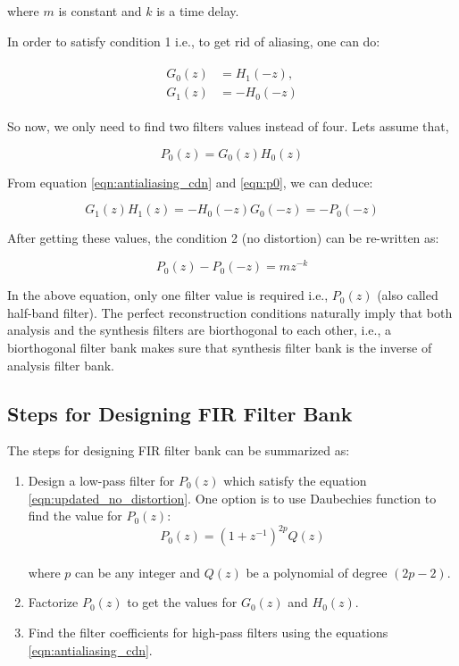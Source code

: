 where $m$ is constant and $k$ is a time delay.

In order to satisfy condition 1 i.e., to get rid of aliasing, one can do:

\begin{align}
	\label{eqn:antialiasing_cdn}
	\begin{split}
		G_0(z) &=  H_1(-z), \\ 
		G_1(z) &=  -H_0(-z)
	\end{split}
\end{align}


So now, we only need to find two filters values instead of four. Lets assume that,

\begin{equation}\label{eqn:p0} 
{P_0(z)=G_{0}(z)H_{0}(z)}
\end{equation}

From equation \ref{eqn:antialiasing_cdn} and \ref{eqn:p0}, we can deduce:

\begin{equation} 
{G_{1}(z)H_{1}(z) = -H_{0}(-z)G_{0}(-z) = -P_0(-z)}
\end{equation}

After getting these values, the condition 2 (no distortion) can be re-written as:

\begin{equation}\label{eqn:updated_no_distortion} 
{P_0(z) - P_0(-z) =  mz^{-k}}
\end{equation}

In the above equation, only one filter value is required i.e., $P_0(z)$ (also called half-band filter). The perfect reconstruction conditions naturally imply that both analysis and the synthesis filters are biorthogonal to each other, i.e., a biorthogonal filter bank makes sure that synthesis filter bank is the inverse of analysis filter bank.


\subsection{Steps for Designing FIR Filter Bank}
The steps for designing FIR filter bank can be summarized as:

\begin{enumerate}
	\item Design a low-pass filter for $P_0(z)$ which satisfy the equation \ref{eqn:updated_no_distortion}. One option is to use Daubechies function to find the value for $P_0(z)$: \\ 
	\begin{equation}\label{eqn:updated_no_distortion} 
	{P_0(z) = (1 + z^{-1})^{2p}Q(z)}
	\end{equation} \\
	where $p$ can be any integer and $Q(z)$ be a polynomial of degree $(2p-2)$.
	\item Factorize $P_0(z)$ to get the values for $G_0(z)$ and $H_0(z)$.
	\item Find the filter coefficients for high-pass filters using the equations \ref{eqn:antialiasing_cdn}. 
\end{enumerate}


